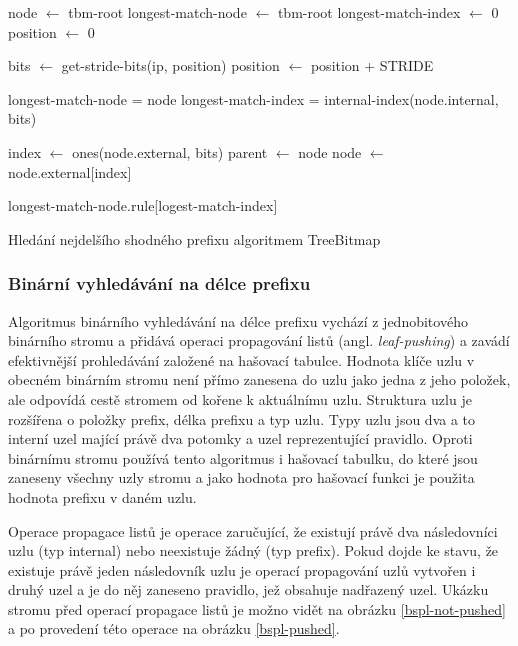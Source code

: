 \begin{algorithm}[H]
	node $\leftarrow$ tbm-root\;
	longest-match-node $\leftarrow$ tbm-root\;
	longest-match-index $\leftarrow$ 0\;
	position $\leftarrow$ 0\;
	{
		bits $\leftarrow$ get-stride-bits(ip, position)\;
		position $\leftarrow$ position + STRIDE\;


		{
			longest-match-node = node\;
			longest-match-index = internal-index(node.internal, bits)\;
		}

		index $\leftarrow$ ones(node.external, bits)\;
		parent $\leftarrow$ node\;
		node $\leftarrow$ node.external[index]\;
	}
	\Return longest-match-node.rule[logest-match-index]\;
	\caption{Hledání nejdelšího shodného prefixu algoritmem TreeBitmap}
    \label{alg:treebitmap}
\end{algorithm}

\subsubsection{Binární vyhledávání na délce prefixu} %

Algoritmus binárního vyhledávání na délce prefixu vychází z jednobitového binárního stromu a přidává
operaci propagování listů (angl. \textit{leaf-pushing}) a zavádí efektivnější prohledávání založené na hašovací
tabulce. Hodnota klíče uzlu v obecném binárním stromu není přímo zanesena do uzlu jako jedna z jeho položek,
ale odpovídá cestě stromem od kořene k aktuálnímu uzlu.
Struktura uzlu je rozšířena o položky prefix, délka prefixu a typ uzlu.
Typy uzlu jsou dva a to interní uzel mající právě dva potomky a uzel reprezentující pravidlo.
Oproti binárnímu stromu používá tento algoritmus i hašovací tabulku, do které jsou zaneseny všechny uzly
stromu a jako hodnota pro hašovací funkci je použita hodnota prefixu v daném uzlu.


Operace propagace listů je operace zaručující, že existují právě dva následovníci uzlu (typ internal) nebo neexistuje žádný (typ prefix).
Pokud dojde ke stavu, že existuje právě jeden následovník uzlu je operací propagování uzlů
vytvořen i druhý uzel a je do něj zaneseno pravidlo, jež obsahuje nadřazený uzel.
Ukázku stromu před operací propagace listů je možno vidět na obrázku \ref{bspl-not-pushed}
a po provedení této operace na obrázku \ref{bspl-pushed}.

